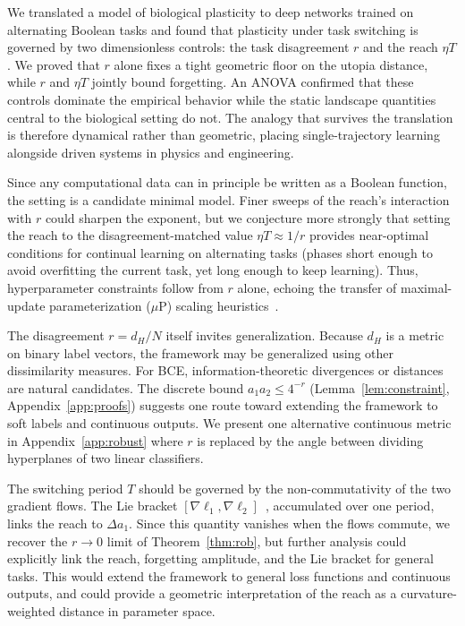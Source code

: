 \documentclass[pmlr]{jmlr} %
\begin{document}
We translated a model of biological plasticity to deep networks trained on alternating Boolean tasks and found that plasticity under task switching is governed by two dimensionless controls: the task disagreement $r$ and the reach $\eta T$. We proved that $r$ alone fixes a tight geometric floor on the utopia distance, while $r$ and $\eta T$ jointly bound forgetting. An ANOVA confirmed that these controls dominate the empirical behavior while the static landscape quantities central to the biological setting do not. The analogy that survives the translation is therefore dynamical rather than geometric, placing single-trajectory learning alongside driven systems in physics and engineering.

Since any computational data can in principle be written as a Boolean function, the setting is a candidate minimal model. Finer sweeps of the reach's interaction with $r$ could sharpen the exponent, but we conjecture more strongly that setting the reach to the disagreement-matched value $\eta T \approx 1/r$ provides near-optimal conditions for continual learning on alternating tasks (phases short enough to avoid overfitting the current task, yet long enough to keep learning). Thus, hyperparameter constraints follow from $r$ alone, echoing the transfer of maximal-update parameterization ($\mu$P) scaling heuristics~\citep{muP2022}.

The disagreement $r=d_H/N$ itself invites generalization. Because $d_H$ is a metric on binary label vectors, the framework may be generalized using other dissimilarity measures. For BCE, information-theoretic divergences or distances are natural candidates. The discrete bound $a_1 a_2 \le 4^{-r}$ (Lemma~\ref{lem:constraint}, Appendix~\ref{app:proofs}) suggests one route toward extending the framework to soft labels and continuous outputs. We present one alternative continuous metric in Appendix~\ref{app:robust} where $r$ is replaced by the angle between dividing hyperplanes of two linear classifiers.

The switching period $T$ should be governed by the non-commutativity of the two gradient flows. The Lie bracket $[\nabla\ell_1,\nabla\ell_2]$~\citep{commute2025}, accumulated over one period, links the reach to $\Delta a_1$. Since this quantity vanishes when the flows commute, we recover the $r\to0$ limit of Theorem~\ref{thm:rob}, but further analysis could explicitly link the reach, forgetting amplitude, and the Lie bracket for general tasks. This would extend the framework to general loss functions and continuous outputs, and could provide a geometric interpretation of the reach as a curvature-weighted distance in parameter space. 
\end{document}
